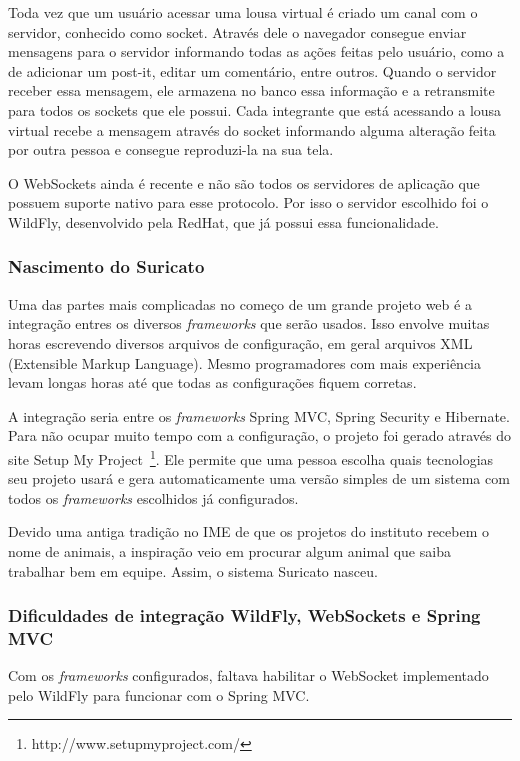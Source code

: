 Toda vez que um usuário acessar uma lousa virtual é criado um canal com o servidor, conhecido como socket. Através dele o navegador consegue enviar mensagens para o servidor informando todas as ações feitas pelo usuário, como a de adicionar um post-it, editar um comentário, entre outros. Quando o servidor receber essa mensagem, ele armazena no banco essa informação e a retransmite para todos os sockets que ele possui. Cada integrante que está acessando a lousa virtual recebe a mensagem através do socket informando alguma alteração feita por outra pessoa e consegue reproduzi-la na sua tela.

O WebSockets ainda é recente e não são todos os servidores de aplicação que possuem suporte nativo para esse protocolo. Por isso o servidor escolhido foi o WildFly, desenvolvido pela RedHat, que já possui essa funcionalidade.

\subsubsection*{Nascimento do Suricato}

Uma das partes mais complicadas no começo de um grande projeto web é a integração entres os diversos \textit{frameworks} que serão usados. Isso envolve muitas horas escrevendo diversos arquivos de configuração, em geral arquivos XML (Extensible Markup Language). Mesmo programadores com mais experiência levam longas horas até que todas as configurações fiquem corretas. 

A integração seria entre os \textit{frameworks} Spring MVC, Spring Security e Hibernate. Para não ocupar muito tempo com a configuração, o projeto foi gerado através do site Setup My Project~\footnote{http://www.setupmyproject.com/}. Ele permite que uma pessoa escolha quais tecnologias seu projeto usará e gera automaticamente uma versão simples de um sistema com todos os \textit{frameworks} escolhidos já configurados.

Devido uma antiga tradição no IME de que os projetos do instituto recebem o nome de animais, a inspiração veio em procurar algum animal que saiba trabalhar bem em equipe. Assim, o sistema Suricato nasceu.

\subsubsection*{Dificuldades de integração WildFly, WebSockets e Spring MVC}

Com os \textit{frameworks} configurados, faltava habilitar o WebSocket implementado pelo WildFly para funcionar com o Spring MVC.

